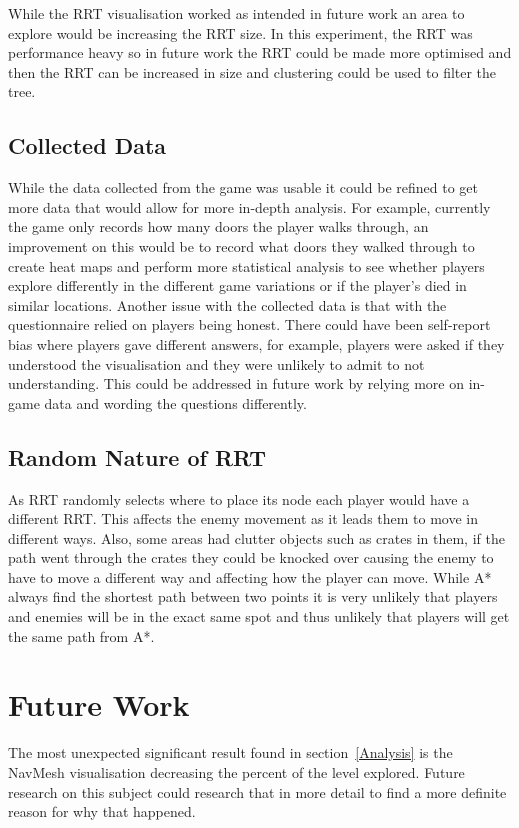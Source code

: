\documentclass[journal]{IEEEtran}
\begin{document}
	While the RRT visualisation worked as intended in future work an area to explore would be increasing the RRT size.  In this experiment, the RRT was performance heavy so in future work the RRT could be made more optimised and then the RRT can be increased in size and clustering could be used to filter the tree.
	
	\subsection{Collected Data}    
	While the data collected from the game was usable it could be refined to get more data that would allow for more in-depth analysis. For example, currently the game only records how many doors the player walks through, an improvement on this would be to record what doors they walked through to create heat maps and perform more statistical analysis to see whether players explore differently in the different game variations or if the player's died in similar locations.
	Another issue with the collected data is that with the questionnaire relied on players being honest. There could have been self-report bias where players gave different answers, for example, players were asked if they understood the visualisation and they were unlikely to admit to not understanding. This could be addressed in future work by relying more on in-game data and wording the questions differently.
	
	\subsection{Random Nature of RRT}
	As RRT randomly selects where to place its node each player would have a different RRT. This affects the enemy movement as it leads them to move in different ways. Also, some areas had clutter objects such as crates in them, if the path went through the crates they could be knocked over causing the enemy to have to move a different way and affecting how the player can move. 
	While A* always find the shortest path between two points it is very unlikely that players and enemies will be in the exact same spot and thus unlikely that players will get the same path from A*. 
	
	
	\section{Future Work} \label{FutureWork}
	The most unexpected significant result found in section~\ref{Analysis} is the NavMesh visualisation decreasing the percent of the level explored. Future research on this subject could research that in more detail to find a more definite reason for why that happened. 
	
\end{document}
